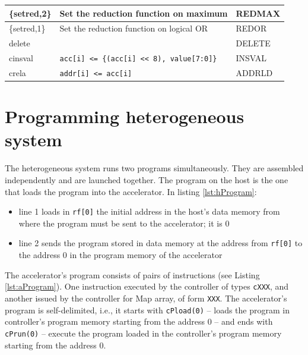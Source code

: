 \begin{table}[H]
\begin{longtable}{|l|l|l|}
\{setred,2\}  & Set the reduction function on maximum             & REDMAX         \\ \hline
\{setred,1\}  & Set the reduction function on logical OR          & REDOR          \\ \hline
delete        &                                                  & DELETE         \\ \hline
cinsval       & \texttt{acc[i] <= \{(acc[i] << 8), value[7:0]\}}  & INSVAL         \\ \hline
crela         & \texttt{addr[i] <= acc[i]}                       & ADDRLD         \\ \hline
\end{longtable}
\end{table}



\section{Programming heterogeneous system}

The heterogeneous system runs two programs simultaneously. They are assembled independently and are launched together. The program on the host is the one that loads the program into the accelerator. In listing \ref{lst:hProgram}:
\begin{itemize}
    \item line 1 loads in {\tt rf[0]} the initial address in the host's data memory from where the program must be sent to the accelerator; it is 0
    \item line 2 sends the program stored in data memory at the address from {\tt rf[0]} to the address 0 in the program memory of the accelerator
\end{itemize}

The accelerator's program consists of pairs of instructions (see Listing \ref{lst:aProgram}). One instruction executed by the controller of types {\tt cXXX}, and another issued by the controller for Map array, of form {\tt XXX}.
The accelerator's program is self-delimited, i.e., it starts with {\tt cPload(0)} -- loads the program in controller's program memory starting from the address 0 -- and ends with {\tt cPrun(0)} -- execute the program loaded in the controller's program memory starting from the address 0.

